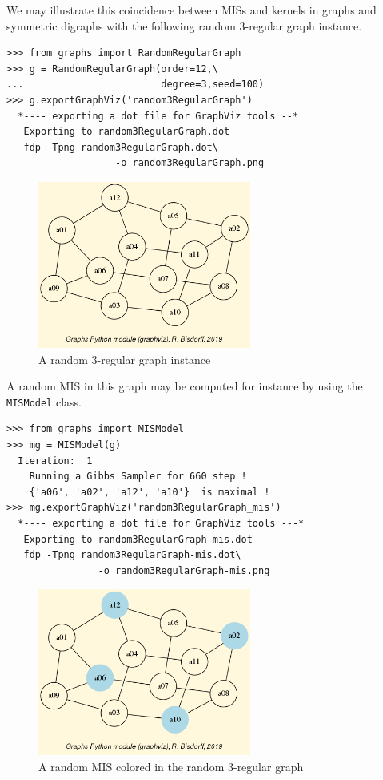 We may illustrate this coincidence between MISs and kernels in graphs
and symmetric digraphs with the following random 3-regular graph
instance.
\begin{lstlisting}
>>> from graphs import RandomRegularGraph
>>> g = RandomRegularGraph(order=12,\
...                        degree=3,seed=100)
>>> g.exportGraphViz('random3RegularGraph')
  *---- exporting a dot file for GraphViz tools --*
   Exporting to random3RegularGraph.dot
   fdp -Tpng random3RegularGraph.dot\
                   -o random3RegularGraph.png
\end{lstlisting}
\begin{figure}[h]
\sidecaption
\includegraphics[width=7cm]{Figures/random3RegularGraph.png}
\caption{A random 3-regular graph instance}
\label{fig:17.1}       %
\end{figure}

A random MIS in this graph may be computed for instance by using the \texttt{MISModel} class.

\begin{lstlisting}
>>> from graphs import MISModel
>>> mg = MISModel(g)
  Iteration:  1
    Running a Gibbs Sampler for 660 step !
    {'a06', 'a02', 'a12', 'a10'}  is maximal !
>>> mg.exportGraphViz('random3RegularGraph_mis')
  *---- exporting a dot file for GraphViz tools ---*
   Exporting to random3RegularGraph-mis.dot
   fdp -Tpng random3RegularGraph-mis.dot\
                -o random3RegularGraph-mis.png
\end{lstlisting}
\begin{figure}[h]
\sidecaption
\includegraphics[width=7cm]{Figures/random3RegularGraph-mis.png}
\caption{A random MIS colored in the random 3-regular graph}
\label{fig:17.2}       %
\end{figure}

